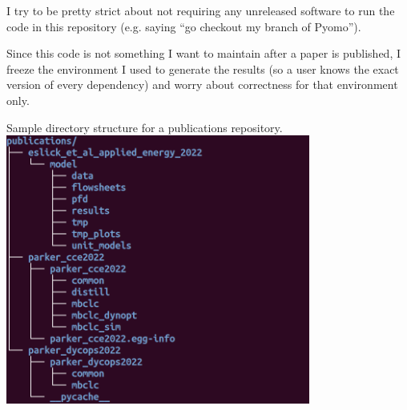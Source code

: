 \documentclass{article}
\begin{document}
I try to be pretty strict about not requiring any unreleased software
to run the code in this repository (e.g. saying ``go checkout my branch
of Pyomo'').

Since this code is not something I want to maintain after a paper is
published, I freeze the environment I used to generate the results
(so a user knows the exact version of every dependency)
and worry about correctness for that environment only.

\begin{center}
  Sample directory structure for a publications repository.\\
  \includegraphics[width=10cm]{publications_tree}
\end{center}
\end{document}
